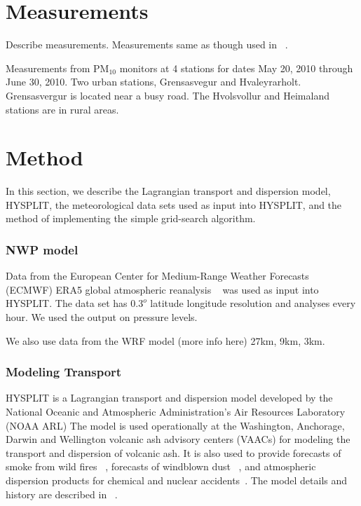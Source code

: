 \documentclass[draft]{agujournal2018}
\begin{document}
\section{Measurements}

Describe measurements.
Measurements same as though used in ~\cite{Leadbetter12}.

Measurements from PM$_{10}$ monitors at  4 stations for dates May 20, 2010 through June 30, 2010.  
Two urban stations, Grensasvegur and Hvaleyrarholt. Grensasvergur is located near a busy road.
The Hvolsvollur and Heimaland stations are in rural areas.


\section{Method}
In this section, we describe the Lagrangian transport and dispersion  model, HYSPLIT, the meteorological data sets used as input into HYSPLIT, and the method of implementing the simple grid-search algorithm.

\subsubsection{NWP model}
Data from the European Center for Medium-Range Weather Forecasts (ECMWF) ERA5 global atmospheric reanalysis ~\citep{era5} was used
as input into HYSPLIT.
The data set has $0.3^o$ latitude longitude resolution and analyses every hour. We used the output on pressure levels.

We also use data from the WRF model (more info here) 27km, 9km, 3km.

\subsubsection{Modeling Transport}
HYSPLIT is a Lagrangian transport and dispersion model developed by the National Oceanic and Atmospheric Administration's Air Resources Laboratory (NOAA ARL)   
The model is used operationally at the  Washington, Anchorage, Darwin and Wellington volcanic ash advisory centers (VAACs) for modeling the transport and dispersion of volcanic ash. 
It is also used to provide 
forecasts of smoke from wild fires ~\citep{Rolph09, Stein09}, forecasts of windblown dust ~\citep{Draxler10}, and atmospheric dispersion products for chemical and nuclear accidents~\citep{Draxler12}. The model details and history are described in 
~\cite{Draxler97, Draxler98, bams}. 
\end{document}
